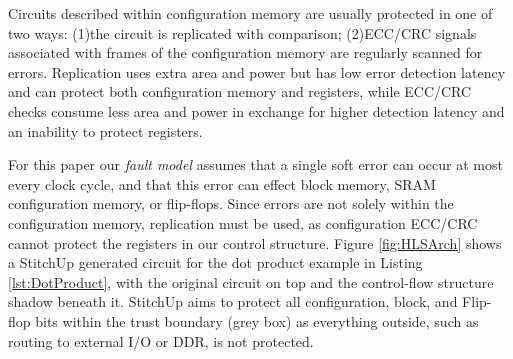 Circuits described within configuration memory are usually protected in one of two ways:
(1)the circuit is replicated with comparison; (2)ECC/CRC signals associated with
frames of the configuration memory are regularly scanned for errors.
Replication uses extra area and power but has low error detection latency and can
protect both configuration memory and registers,
while ECC/CRC checks consume less area and power in exchange for higher detection 
latency and an inability to protect registers.

For this paper our \emph{fault model} assumes that a single soft error
can occur at most every clock cycle, and that this error can effect block memory,
SRAM configuration memory, or flip-flops.
Since errors are not solely within the configuration memory, replication must be used,
as configuration ECC/CRC cannot protect the registers in our control structure.
Figure \ref{fig:HLSArch} shows a StitchUp generated circuit for the dot product 
example in Listing \ref{lst:DotProduct}, with the original circuit on top and the
control-flow structure shadow beneath it.
StitchUp aims to protect all configuration, block, and Flip-flop bits within the
trust boundary (grey box) as everything outside, such as routing to
external I/O or DDR, is not protected.


